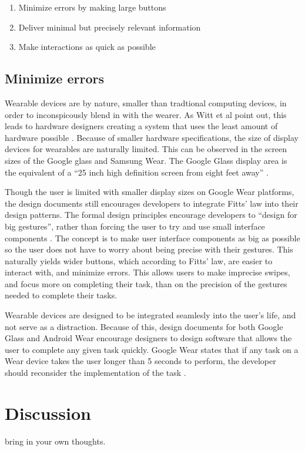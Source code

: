 \documentclass[12pt]{article}
\begin{document}
\begin{enumerate}
\item{Minimize errors by making large buttons}
\item Deliver minimal but precisely relevant information
\item{Make interactions as quick as possible}
\end{enumerate}

\subsection{Minimize errors}
Wearable devices are by nature, smaller than tradtional computing devices, in order to inconspicously blend in with the wearer. As Witt et al point out, this leads to hardware designers creating a system that uses the least amount of hardware possible \cite{witt}. Because of smaller hardware specifications, the size of display devices for wearables are naturally limited. This can be observed in the screen sizes of the Google glass and Samsung Wear. The Google Glass display area is the equivalent of a ``25 inch high definition screen from eight feet away'' \cite{goog2}.

Though the user is limited with smaller display sizes on Google Wear platforms, the design documents still encourages developers to integrate Fitts' law into their design patterns. The formal design principles encourage developers to ``design for big gestures'', rather than forcing the user to try and use small interface components \cite{andr}. The concept is to make user interface components as big as possible so the user does not have to worry about being precise with their gestures. This naturally yields wider buttons, which according to Fitts' law, are easier to interact with, and minimize errors. This allows users to make imprecise swipes, and focus more on completing their task, than on the precision of the gestures needed to complete their tasks.

Wearable devices are designed to be integrated seamlesly into the user's life, and not serve as a distraction. Because of this, design documents for both Google Glass and Android Wear encourage designers to design software that allows the user to complete any given task quickly. Google Wear states that if any task on a Wear device takes the user longer than 5 seconds to perform, the developer should reconsider the implementation of the task \cite{andr}. 

\section{Discussion}
bring in your own thoughts. 
\end{document}
